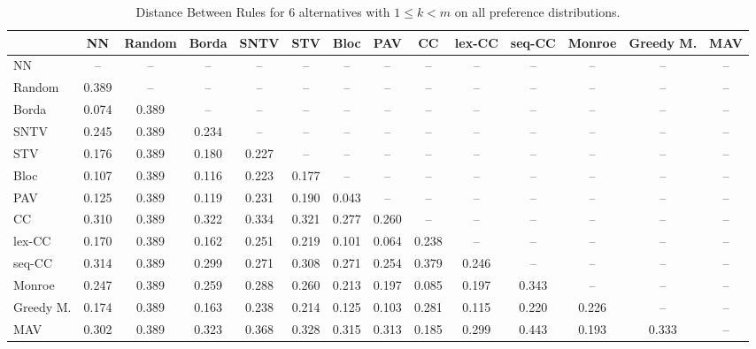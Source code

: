 
\begin{table*}
\centering
\begin{tabular}{lccccccccccccc}
\toprule
 & NN & Random & Borda & SNTV & STV & Bloc & PAV & CC & lex-CC & seq-CC & Monroe & Greedy M. & MAV \\
\midrule
NN & -- & -- & -- & -- & -- & -- & -- & -- & -- & -- & -- & -- & -- \\
Random & 0.389 & -- & -- & -- & -- & -- & -- & -- & -- & -- & -- & -- & -- \\
Borda & 0.074 & 0.389 & -- & -- & -- & -- & -- & -- & -- & -- & -- & -- & -- \\
SNTV & 0.245 & 0.389 & 0.234 & -- & -- & -- & -- & -- & -- & -- & -- & -- & -- \\
STV & 0.176 & 0.389 & 0.180 & 0.227 & -- & -- & -- & -- & -- & -- & -- & -- & -- \\
Bloc & 0.107 & 0.389 & 0.116 & 0.223 & 0.177 & -- & -- & -- & -- & -- & -- & -- & -- \\
PAV & 0.125 & 0.389 & 0.119 & 0.231 & 0.190 & 0.043 & -- & -- & -- & -- & -- & -- & -- \\
CC & 0.310 & 0.389 & 0.322 & 0.334 & 0.321 & 0.277 & 0.260 & -- & -- & -- & -- & -- & -- \\
lex-CC & 0.170 & 0.389 & 0.162 & 0.251 & 0.219 & 0.101 & 0.064 & 0.238 & -- & -- & -- & -- & -- \\
seq-CC & 0.314 & 0.389 & 0.299 & 0.271 & 0.308 & 0.271 & 0.254 & 0.379 & 0.246 & -- & -- & -- & -- \\
Monroe & 0.247 & 0.389 & 0.259 & 0.288 & 0.260 & 0.213 & 0.197 & 0.085 & 0.197 & 0.343 & -- & -- & -- \\
Greedy M. & 0.174 & 0.389 & 0.163 & 0.238 & 0.214 & 0.125 & 0.103 & 0.281 & 0.115 & 0.220 & 0.226 & -- & -- \\
MAV & 0.302 & 0.389 & 0.323 & 0.368 & 0.328 & 0.315 & 0.313 & 0.185 & 0.299 & 0.443 & 0.193 & 0.333 & -- \\
\bottomrule
\end{tabular}

\caption{Distance Between Rules for 6 alternatives with $1 \leq k < m$ on all preference distributions.}
\end{table*}
